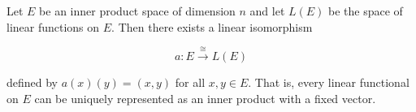 Let $E$ be an inner product space of dimension $n$ and let $L(E)$ be the space of linear functions on $E$. Then there exists a linear isomorphism

$$a \colon E \xrightarrow{\cong} L(E)$$

defined by $a(x)(y) = (x, y)$ for all $x, y \in E$. That is, every linear functional on $E$ can be uniquely represented as an inner product with a fixed vector.
